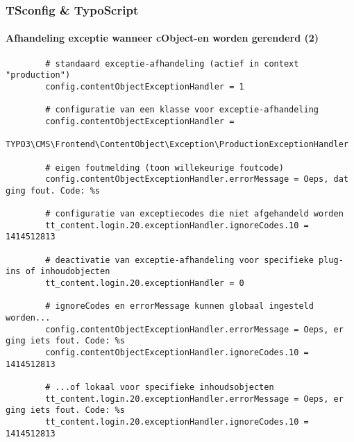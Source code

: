 \begin{frame}[fragile]
	\frametitle{TSconfig \& TypoScript}
	\framesubtitle{Afhandeling exceptie wanneer cObject-en worden gerenderd (2)}
	
	\lstset{
		basicstyle=\tiny\ttfamily
	}
	
	\begin{lstlisting}
		# standaard exceptie-afhandeling (actief in context "production")
		config.contentObjectExceptionHandler = 1

		# configuratie van een klasse voor exceptie-afhandeling
		config.contentObjectExceptionHandler =
		  TYPO3\CMS\Frontend\ContentObject\Exception\ProductionExceptionHandler

		# eigen foutmelding (toon willekeurige foutcode)
		config.contentObjectExceptionHandler.errorMessage = Oeps, dat ging fout. Code: %s

		# configuratie van exceptiecodes die niet afgehandeld worden
		tt_content.login.20.exceptionHandler.ignoreCodes.10 = 1414512813

		# deactivatie van exceptie-afhandeling voor specifieke plug-ins of inhoudobjecten
		tt_content.login.20.exceptionHandler = 0

		# ignoreCodes en errorMessage kunnen globaal ingesteld worden...
		config.contentObjectExceptionHandler.errorMessage = Oeps, er ging iets fout. Code: %s
		config.contentObjectExceptionHandler.ignoreCodes.10 = 1414512813

		# ...of lokaal voor specifieke inhoudsobjecten
		tt_content.login.20.exceptionHandler.errorMessage = Oeps, er ging iets fout. Code: %s
		tt_content.login.20.exceptionHandler.ignoreCodes.10 = 1414512813
	\end{lstlisting}

\end{frame}


